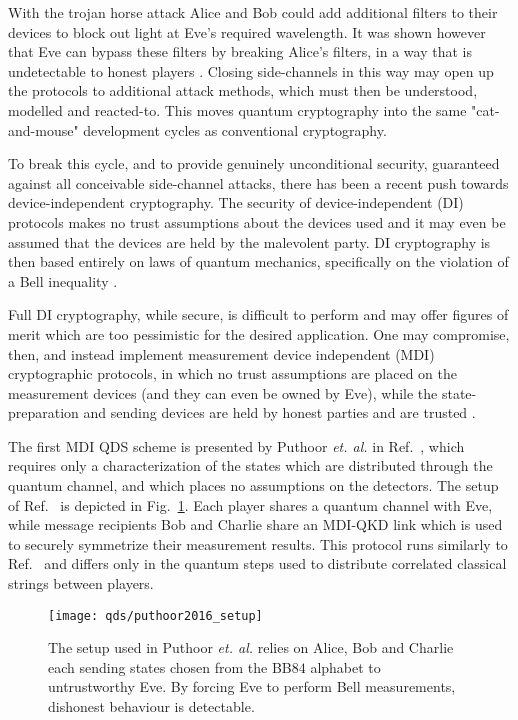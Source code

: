 With the trojan horse attack Alice and Bob could add additional filters to their devices to block out light at Eve's required wavelength. It was shown however that Eve can bypass these filters by breaking Alice's filters, in a way that is undetectable to honest players \cite{Sajeed2016}. Closing side-channels in this way may open up the protocols to additional attack methods, which must then be understood, modelled and reacted-to. This moves quantum cryptography into the same "cat-and-mouse" development cycles as conventional cryptography. 

To break this cycle, and to provide genuinely unconditional security, guaranteed against all conceivable side-channel attacks, there has been a recent push towards device-independent cryptography. The security of device-independent (DI) protocols makes no trust assumptions about the devices used and it may even be assumed that the  devices are held by the malevolent party. DI cryptography is then based entirely on laws of quantum mechanics, specifically on the violation of a Bell inequality \cite{Vazirani2014, Pironio2009, Colbeck2009}. 

Full DI cryptography, while secure, is difficult to perform and may offer figures of merit which are too pessimistic for the desired application. One may compromise, then, and instead implement measurement device independent (MDI) cryptographic protocols, in which no trust assumptions are placed on the measurement devices (and they can even be owned by Eve), while the state-preparation and sending devices are held by honest parties and are trusted \cite{Lo2012}.

The first MDI QDS scheme is presented by Puthoor \emph{et. al.} in Ref.~\cite{Puthoor2016}, which requires only a characterization of the states which are distributed through the quantum channel, and which places no assumptions on the detectors. The setup of Ref.~\cite{Puthoor2016} is depicted in Fig.~\ref{fig:puthoor2016_setup}. Each player shares a quantum channel with Eve, while message recipients Bob and Charlie share an MDI-QKD link which is used to securely symmetrize their measurement results. This protocol runs similarly to Ref.~\cite{Amiri2016} and differs only in the quantum steps used to distribute correlated classical strings between players. 

\begin{figure}[htp]
\captionsetup{width=0.8\linewidth}
\centering
\texttt{[image: qds/puthoor2016\_setup]}
\caption{\label{fig:puthoor2016_setup} The setup used in Puthoor \emph{et. al.} \cite{Puthoor2016} relies on Alice, Bob and Charlie each sending states chosen from the BB$84$ alphabet to untrustworthy Eve. By forcing Eve to perform Bell measurements, dishonest behaviour is detectable.}
\end{figure}

